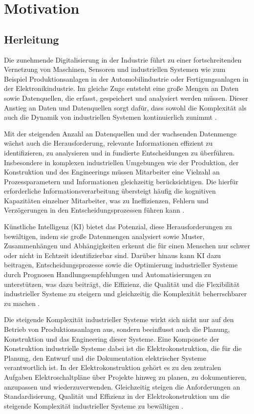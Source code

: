 \chapter{Motivation} 
\label{chap:motivation}

\section{Herleitung}
\label{sec:herleitung}

Die zunehmende Digitalisierung in der Industrie führt zu einer fortschreitenden Vernetzung von Maschinen, 
Sensoren und industriellen Systemen wie zum Beispiel Produktionsanlagen in der Automobilindustrie oder Fertigungsanlagen in der Elektronikindustrie.
Im gleiche Zuge entsteht eine große Mengen an Daten sowie Datenquellen, die erfasst, gespeichert und analysiert werden müssen. 
Dieser Anstieg an Daten und Datenquellen sorgt dafür, dass sowohl die Komplexität als auch die Dynamik von industriellen Systemen kontinuierlich zunimmt \parencite{OECD2024}.

Mit der steigenden Anzahl an Datenquellen und der wachsenden Datenmenge wächst auch die Herausforderung, relevante Informationen effizient zu identifizieren, zu analysieren und in fundierte Entscheidungen zu überführen.
Insbesondere in komplexen industriellen Umgebungen wie der Produktion, der Konstruktion und des Engineerings müssen Mitarbeiter eine Vielzahl an Prozessparametern und Informationen gleichzeitig berücksichtigen.
Die hierfür erforderliche Informationsverarbeitung übersteigt häufig die kognitiven Kapazitäten einzelner Mitarbeiter, was zu Ineffizienzen, Fehlern und Verzögerungen in den Entscheidungsprozessen führen kann \parencite{WEF2023AIRevolution}.

Künstliche Intelligenz (KI) bietet das Potenzial, diese Herausforderungen zu bewältigen, indem sie große Datenmengen analysiert sowie Muster, 
Zusammenhängen und Abhängigkeiten erkennt die für einen Menschen nur schwer oder nicht in Echtzeit identifizierbar sind. 
Darüber hinaus kann KI dazu beitragen, Entscheidungsprozesse sowie die Optimierung industrieller Systeme durch Prognosen
Handlungsempfehlungen und Automatisierungen zu unterstützen, was dazu beiträgt, 
die Effizienz, die Qualität und die Flexibilität industrieller Systeme zu steigern und gleichzeitig die Komplexität beherrschbarer zu machen \parencite{WEF2026}.

Die steigende Komplexität industrieller Systeme wirkt sich nicht nur auf den Betrieb von Produktionsanlagen aus, sondern beeinflusst auch die Planung, Konstruktion und das Engineering dieser Systeme.
Eine Komponete der Konstruktion industrielle Systeme dabei ist die Elektrokonstruktion, die für die Planung, den Entwurf und die Dokumentation elektrischer Systeme verantwortlich ist.
In der Elektrokonstruktion gehört es zu den zentralen Aufgaben Elektroschaltpläne über Projekte hinweg zu planen, zu dokumentieren, anzupassen und wiederzuverwenden.
Gleichzeitig steigen die Anforderungen an Standardisierung, Qualität und Effizienz in der Elektrokonstruktion um die steigende Komplexität industrieller Systeme zu bewältigen \parencite{EPLAN2022Makrobibliotheken}.


